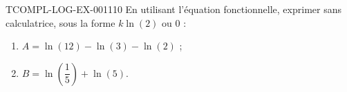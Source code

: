 \begin{exercice}{TCOMPL-LOG-EX-001}{1}{10}
En utilisant l'équation fonctionnelle, exprimer sans calculatrice, sous la forme $k\ln(2)$ ou $0$ :
\begin{enumerate}
  \item $A = \ln(12) - \ln(3) - \ln(2)$ ;
  \item $B = \ln\!\left(\dfrac{1}{5}\right) + \ln(5)$.
\end{enumerate}
\end{exercice}
